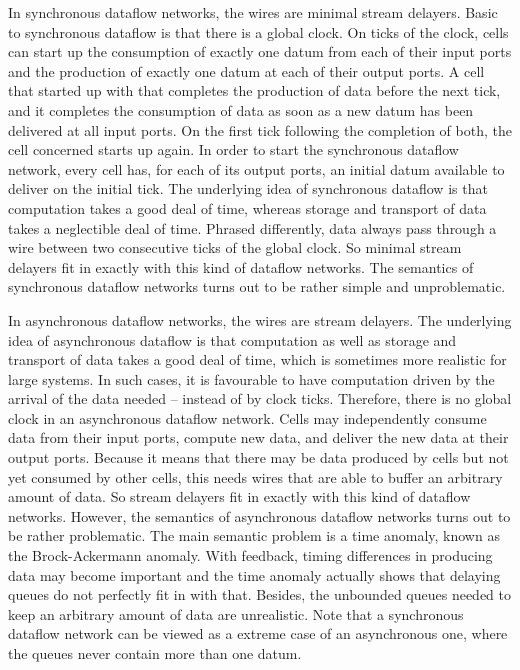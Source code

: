 \documentclass[fleqn]{llncs}
\begin{document}
In synchronous dataflow networks, the wires are minimal stream delayers.
Basic to synchronous dataflow is that there is a global clock.
On ticks of the clock, cells can start up the consumption of exactly
one datum from each of their input ports and the production of exactly
one datum at each of their output ports.
A cell that started up with that completes the production of data before
the next tick, and it completes the consumption of data as soon as a
new datum has been delivered at all input ports.
On the first tick following the completion of both, the cell concerned
starts up again.
In order to start the synchronous dataflow network, every cell has, for
each of its output ports, an initial datum available to deliver on the
initial tick.
The underlying idea of synchronous dataflow is that computation takes a
good deal of time, whereas storage and transport of data takes a
neglectible deal of time.
Phrased differently, data always pass through a wire between two
consecutive ticks of the global clock.
So minimal stream delayers fit in exactly with this kind of dataflow
networks.
The semantics of synchronous dataflow networks turns out to be rather
simple and unproblematic.

In asynchronous dataflow networks, the wires are stream delayers.
The underlying idea of asynchronous dataflow is that computation as
well as storage and transport of data takes a good deal of time, which
is sometimes more realistic for large systems.
In such cases, it is favourable to have computation driven by the
arrival of the data needed -- instead of by clock ticks.
Therefore, there is no global clock in an asynchronous dataflow network.
Cells may independently consume data from their input ports,
compute new data, and deliver the new data at their output ports.
Because it means that there may be data produced by cells but not yet
consumed by other cells, this needs wires that are able to buffer an
arbitrary amount of data.
So stream delayers fit in exactly with this kind of dataflow networks.
However, the semantics of asynchronous dataflow networks turns out to
be rather problematic.
The main semantic problem is a time anomaly, known as the
Brock-Ackermann anomaly.
With feedback, timing differences in producing data may become
important and the time anomaly actually shows that delaying queues do
not perfectly fit in with that.
Besides, the unbounded queues needed to keep an arbitrary amount of data
are unrealistic.
Note that a synchronous dataflow network can be viewed as a extreme
case of an asynchronous one, where the queues never contain more than
one datum.
\end{document}

